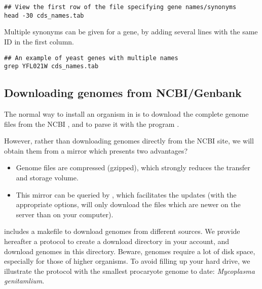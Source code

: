 \begin{footnotesize}
\begin{verbatim}
## View the first row of the file specifying gene names/synonyms
head -30 cds_names.tab
\end{verbatim}
\end{footnotesize}


Multiple synonyms can be given for a gene, by adding several lines with
the same ID in the first column.

\begin{footnotesize}
\begin{verbatim}
## An example of yeast genes with multiple names
grep YFL021W cds_names.tab 
\end{verbatim}
\end{footnotesize}



\subsection{Downloading genomes from NCBI/Genbank}

The normal way to install an organism in \RSAT is to download the
complete genome files from the NCBI
, and to parse it with the
program .

However, rather than downloading genomes directly from the NCBI site,
we will obtain them from a mirror
 which presents two
advantages?

\begin{itemize}
\item Genome files are compressed (gzipped), which strongly reduces
  the transfer and storage volume. 
\item This mirror can be queried by , which facilitates
  the updates (with the appropriate options,  will only
  download the files which are newer on the server than on your
  computer).
\end{itemize}

\RSAT includes a makefile to download genomes from different sources.
We provide hereafter a protocol to create a download directory in your
account, and download genomes in this directory. Beware, genomes
require a lot of disk space, especially for those of higher
organisms. To avoid filling up your hard drive, we illustrate the protocol
with the smallest procaryote genome to date: \textit{Mycoplasma
  genitamlium}.


